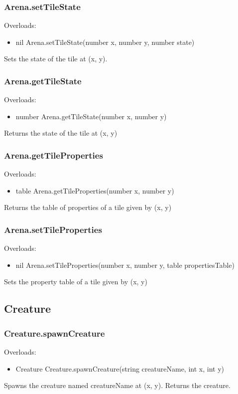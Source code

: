 \documentclass{book}
\newenvironment{ulist}
	{\begin{itemize}
			\itemsep0em}
	{\end{itemize}}
\begin{document}
\subsubsection{Arena.setTileState}
Overloads:
\begin{ulist}
	\item nil Arena.setTileState(number x, number y, number state)
\end{ulist}
Sets the state of the tile at (x, y).

\subsubsection{Arena.getTileState}
Overloads:
\begin{ulist}
	\item number Arena.getTileState(number x, number y)
\end{ulist}
Returns the state of the tile at (x, y)

\subsubsection{Arena.getTileProperties}
Overloads:
\begin{ulist}
	\item table Arena.getTileProperties(number x, number y)
\end{ulist}
Returns the table of properties of a tile given by (x, y)

\subsubsection{Arena.setTileProperties}
Overloads:
\begin{ulist}
	\item nil Arena.setTileProperties(number x, number y, table propertiesTable)
\end{ulist}
Sets the property table of a tile given by (x, y)

\subsection{Creature}
\subsubsection{Creature.spawnCreature}
Overloads:
\begin{ulist}
	\item Creature Creature.spawnCreature(string creatureName, int x, int y)
\end{ulist}
Spawns the creature named creatureName at (x, y). Returns the creature.
\end{document}
